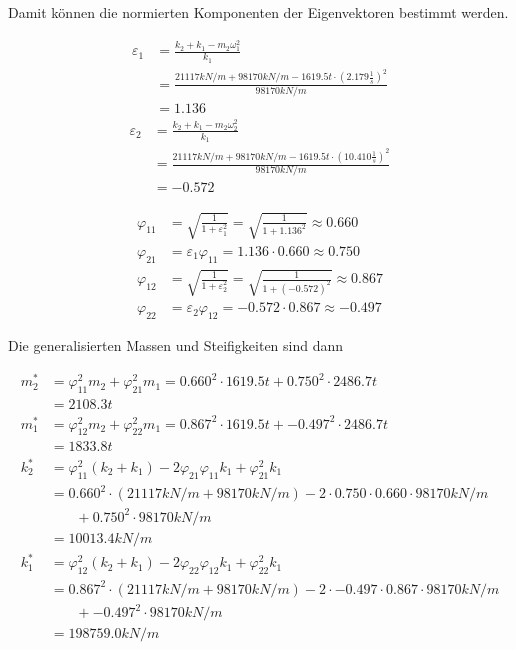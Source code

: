 Damit können die normierten Komponenten der Eigenvektoren bestimmt werden.

\begin{align*}
\varepsilon_1 &= \frac{k_2 + k_1 - m_2 \omega_1^2}{k_1} \\
              &= \frac{21117 kN/m + 98170 kN/m - 1619.5 t \cdot (2.179 \frac{1}{s})^2}{98170 kN/m}\\
              &= 1.136
\end{align*}
\begin{align*}
\varepsilon_2 &= \frac{k_2 + k_1 - m_2 \omega_2^2}{k_1} \\
              &= \frac{21117 kN/m + 98170 kN/m - 1619.5 t \cdot (10.410 \frac{1}{s})^2}{98170 kN/m}\\
              &= -0.572
\end{align*}

\begin{align*}
\varphi_{11} &= \sqrt{\frac{1}{1 + \varepsilon_1^2}} = \sqrt{\frac{1}{1 + 1.136^2}} \approx 0.660\\
\varphi_{21} &= \varepsilon_1 \varphi_{11} = 1.136 \cdot 0.660 \approx 0.750\\
\varphi_{12} &= \sqrt{\frac{1}{1 + \varepsilon_2^2}} = \sqrt{\frac{1}{1 + (-0.572)^2}} \approx 0.867\\
\varphi_{22} &= \varepsilon_2 \varphi_{12} = -0.572 \cdot 0.867 \approx -0.497
\end{align*}

Die generalisierten Massen und Steifigkeiten sind dann

\begin{align*}
m_2^* &= \varphi_{11}^2 m_2 + \varphi_{21}^2 m_1 = 0.660^2 \cdot 1619.5 t + 0.750^2 \cdot 2486.7 t\\
      &= 2108.3 t\\[2em]
m_1^* &= \varphi_{12}^2 m_2 + \varphi_{22}^2 m_1 = 0.867^2 \cdot 1619.5 t + -0.497^2 \cdot 2486.7 t\\
      &= 1833.8 t\\[2em]
k_2^* &= \varphi_{11}^2 (k_2 + k_1) - 2 \varphi_{21} \varphi_{11} k_1 + \varphi_{21}^2 k_1\\
      &= 0.660^2 \cdot (21117 kN/m +  98170 kN/m) - 2 \cdot 0.750 \cdot 0.660 \cdot 98170 kN/m\\
      &\phantom{{}=1} + 0.750^2 \cdot  98170 kN/m\\
      &= 10013.4 kN/m\\[2em]
k_1^* &= \varphi_{12}^2 (k_2 + k_1) - 2 \varphi_{22} \varphi_{12} k_1 + \varphi_{22}^2 k_1\\
      &= 0.867^2 \cdot (21117 kN/m +  98170 kN/m) - 2 \cdot -0.497 \cdot 0.867 \cdot 98170 kN/m\\
      &\phantom{{}=1} + -0.497^2 \cdot 98170 kN/m\\
      &= 198759.0 kN/m
\end{align*}

